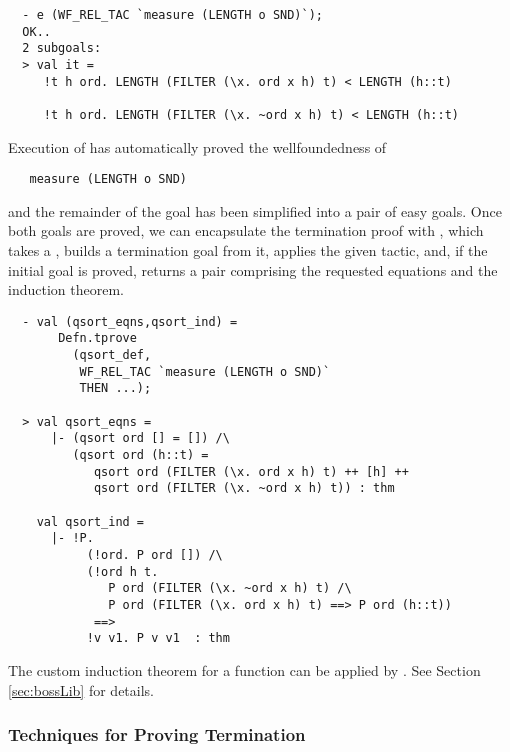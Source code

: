\begin{session}
\begin{hol}
\begin{verbatim}
  - e (WF_REL_TAC `measure (LENGTH o SND)`);
  OK..
  2 subgoals:
  > val it =
     !t h ord. LENGTH (FILTER (\x. ord x h) t) < LENGTH (h::t)
     
     !t h ord. LENGTH (FILTER (\x. ~ord x h) t) < LENGTH (h::t)
\end{verbatim}
\end{hol}
\end{session}
%
Execution of  has automatically proved the
wellfoundedness of
%
\begin{hol}
\begin{verbatim}
   measure (LENGTH o SND)
\end{verbatim}
\end{hol}
%
and the remainder of the goal has been simplified into a
pair of easy goals. Once both goals are proved, we can encapsulate 
the termination proof with , which takes a , 
builds a termination goal from it, applies the given tactic, and, if the
initial goal is proved, returns a pair comprising the requested
equations and the induction theorem.

\begin{session}
\begin{hol}
\begin{verbatim}
  - val (qsort_eqns,qsort_ind) =
       Defn.tprove
         (qsort_def,
          WF_REL_TAC `measure (LENGTH o SND)`
          THEN ...);

  > val qsort_eqns =
      |- (qsort ord [] = []) /\
         (qsort ord (h::t) =
            qsort ord (FILTER (\x. ord x h) t) ++ [h] ++
            qsort ord (FILTER (\x. ~ord x h) t)) : thm

    val qsort_ind =
      |- !P.
           (!ord. P ord []) /\
           (!ord h t.
              P ord (FILTER (\x. ~ord x h) t) /\
              P ord (FILTER (\x. ord x h) t) ==> P ord (h::t)) 
            ==>
           !v v1. P v v1  : thm
\end{verbatim}
\end{hol}
\end{session}
The custom induction theorem for a function can be applied by .
See Section \ref{sec:bossLib} for details.

\subsubsection{Techniques for Proving Termination}

